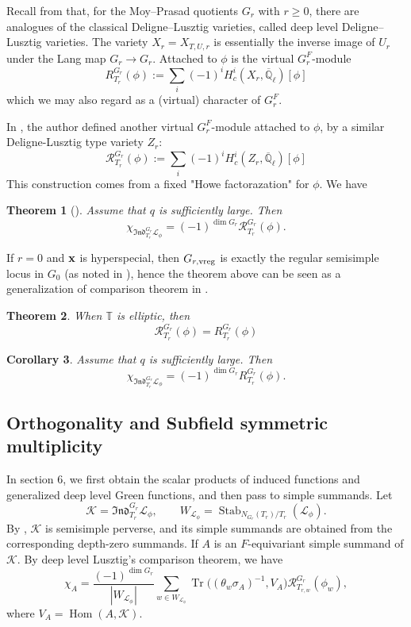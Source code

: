 \documentclass[11pt,letterpaper]{amsart}
\newcommand{\ov}{\overline}
\newtheorem{theorem}{Theorem}
\newtheorem{corollary}[theorem]{Corollary}
\theoremstyle{definition}
\numberwithin{equation}{section}
\numberwithin{theorem}{section}
\begin{document}
Recall from \cite{CI_MPDL,Lusztig_04} that, for the Moy--Prasad quotients $G_r$
with $r\geq0$, there are analogues of the classical Deligne--Lusztig
varieties, called deep level Deligne--Lusztig varieties.  The variety
$X_r=X_{T,U,r}$ is essentially the inverse image of $U_r$ under the Lang
map $G_r\to G_r$.  Attached to $\phi$ is the virtual $G_r^F$-module
\[R_{T_r}^{G_r}(\phi) := \sum_i (-1)^i H_c^i(X_r, \ov {\mathbb{Q}}_\ell)[\phi]
\]
which we may also regard as a (virtual) character of $G_r^F$.

In \cite{Nie_24}, the author defined another virtual $G_r^F$-module attached to $\phi$, by a similar Deligne-Lusztig type variety $Z_r$:
\[\mathcal{R}_{T_r}^{G_r}(\phi) := \sum_i (-1)^i H_c^i(Z_r, \ov {\mathbb{Q}}_\ell)[\phi]
\]
This construction comes from a fixed "Howe factorazation"\cite{Kaletha_19} for $\phi$. We have
\begin{theorem}[]
Assume that $q$ is sufficiently large. Then
\[\chi_{\mathfrak{Ind}^{G_r}_{T_r}\mathcal L_\phi}
 =(-1)^{\dim G_r}\mathcal R^{G_r}_{T_r}(\phi).
\]
\end{theorem}

If $r=0$ and ${\bf x}$ is hyperspecial, then $G_{r,{\rm vreg}}$ is exactly the regular semisimple locus in $G_0$ (as noted in \cite[Proposition 5.4]{CI_MPDL}), hence the theorem above can be seen as a generalization of comparison theorem in \cite{Lu90}.


\begin{theorem}\cite[Theorem]{Nie_24}
    When $\mathbb{T}$ is elliptic, then 
    \[\mathcal{R}_{T_r}^{G_r}(\phi)=R_{T_r}^{G_r}(\phi)\]
\end{theorem}

\begin{corollary}
    Assume that $q$ is sufficiently large. Then 
\[\chi_{\mathfrak{Ind}^{G_r}_{T_r}\mathcal L_\phi}
 =(-1)^{\dim G_r} R^{G_r}_{T_r}(\phi).
\]
\end{corollary}

\subsection{Orthogonality and Subfield symmetric multiplicity }
In section 6, we first obtain the scalar products of
induced functions and generalized deep level Green functions, and then pass
to simple summands. Let
\[
 \mathcal K=\mathfrak{Ind}_{T_r}^{G_r}\mathcal L_\phi,
 \qquad
 W_{\mathcal L_\phi}
 =\operatorname{Stab}_{N_{G_r}(T_r)/T_r}(\mathcal L_\phi).
\]
By \cite[\S5]{INY25}, \(\mathcal K\) is semisimple perverse, and its
simple summands are obtained from the corresponding depth-zero summands.
If \(A\) is an
\(F\)-equivariant simple summand of \(\mathcal K\). By deep level Lusztig's comparison theorem, we have 
\[
 \chi_A
 =\frac{(-1)^{\dim G_r}}{|W_{\mathcal L_\phi}|}
   \sum_{w\in W_{\mathcal L_\phi}}
   \operatorname{Tr}\bigl((\theta_w\sigma_A)^{-1},V_A\bigr)
   \mathcal R_{T_{r,w}}^{G_r}(\phi_w),
\]
where \(V_A=\operatorname{Hom}(A,\mathcal K)\).  
\end{document}
